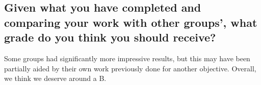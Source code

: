 \documentclass[10pt, conference]{IEEEtran}
\begin{document}
\subsection{Given what you have completed and comparing your work with other groups', what grade do you think you should receive?}
\label{sec-7-3}

   Some groups had significantly more impressive results, but this may
   have been partially aided by their own work previously done for
   another objective. Overall, we think we deserve around a B.
\end{document}
